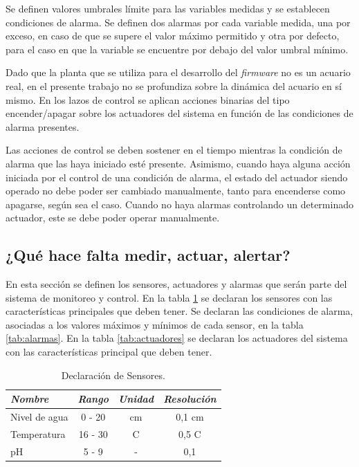 Se definen valores umbrales límite para las variables medidas y se establecen condiciones de alarma.  Se definen dos alarmas por cada variable medida, una por exceso, en caso de que se supere el valor máximo permitido y otra por defecto, para el caso en que la variable se encuentre por debajo del valor umbral mínimo.

Dado que la planta que se utiliza para el desarrollo del \textit{firmware} no es un acuario real, en el presente trabajo no se profundiza sobre la dinámica del acuario en sí mismo.  En los lazos de control se aplican acciones binarias del tipo encender/apagar sobre los actuadores del sistema en función de las condiciones de alarma presentes. 

Las acciones de control se deben sostener en el tiempo mientras la condición de alarma que las haya iniciado esté presente. Asimismo, cuando haya alguna acción iniciada por el control de una condición de alarma, el estado del actuador siendo operado no debe poder ser cambiado manualmente, tanto para encenderse como apagarse, según sea el caso. Cuando no haya alarmas controlando un determinado actuador, este se debe poder operar manualmente.


\subsection{¿Qué hace falta medir, actuar, alertar?}

En esta sección se definen los sensores, actuadores y alarmas que serán parte del sistema de monitoreo y control.  En la tabla \ref{tab:sensores} se declaran los sensores con las características principales que deben tener. Se declaran las condiciones de alarma, asociadas a los valores máximos y mínimos de cada sensor, en la tabla \ref{tab:alarmas}. En la tabla \ref{tab:actuadores} se declaran los actuadores del sistema con las características principal que deben tener.   

\vspace{30px}

\begin{table}[ht]
	\centering
	\caption{Declaración de Sensores.}
	\begin{tabular}{@{} l *3c @{}}    \toprule
		\emph{\textbf{Nombre}} & \emph{\textbf{Rango}} & \emph{\textbf{Unidad}}  & \emph{\textbf{Resolución}}  \\
		\midrule
		Nivel de agua	& 0 - 20 	& cm		 	& 0,1 cm\\		
		Temperatura		& 16 - 30	& \grados C 	& 0,5 \grados C\\
		pH				& 5 - 9		& -			& 0,1 \\ 
		\bottomrule
		\hline
	\end{tabular}
	\label{tab:sensores}
\end{table}

